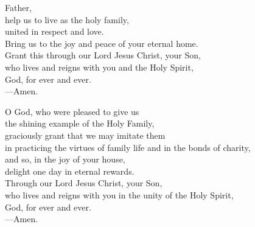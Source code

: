 \prayer

\begin{prayerverse}

Father,\\
help us to live as the holy family,\\
united in respect and love.\\
Bring us to the joy and peace of your eternal home.\\
Grant this through our Lord Jesus Christ, your Son,\\
who lives and reigns with you and the Holy Spirit,\\
God, for ever and ever.\\
{\color{red}---\thinspace}Amen.

\end{prayerverse}


\begin{prayerverse}

O God, who were pleased to give us\\
the shining example of the Holy Family,\\
graciously grant that we may imitate them\\
in practicing the virtues of family life and in the bonds of charity,\\
and so, in the joy of your house,\\
delight one day in eternal rewards.\\
Through our Lord Jesus Christ, your Son,\\
who lives and reigns with you in the unity of the Holy Spirit,\\
God, for ever and ever.\\
{\color{red}---\thinspace}Amen.

\end{prayerverse}